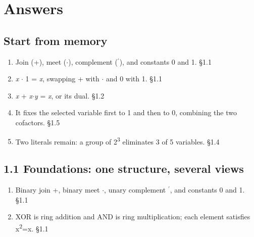 \documentclass[11pt]{article}
\begin{document}
\clearpage
\section{Answers}
\begin{keepsection}\subsection{Start from memory}

\begin{enumerate}
\item Join (+), meet (\ensuremath{\cdot}), complement (\ensuremath{{}^{\prime}}), and constants 0 and 1. \hfill{\small\color{FAUblue}§1.1}
\item \textit{x} \ensuremath{\cdot} 1 = \textit{x}, swapping + with \ensuremath{\cdot} and 0 with 1. \hfill{\small\color{FAUblue}§1.1}
\item \textit{x} + \textit{x}\ensuremath{\cdot}\textit{y} = \textit{x}, or its dual. \hfill{\small\color{FAUblue}§1.2}
\item It fixes the selected variable first to 1 and then to 0, combining the two cofactors. \hfill{\small\color{FAUblue}§1.5}
\item Two literals remain: a group of 2\textsuperscript{3} eliminates 3 of 5 variables. \hfill{\small\color{FAUblue}§1.4}
\end{enumerate}

\end{keepsection}
\begin{keepsection}\subsection{1.1 Foundations: one structure, several views}

\begin{enumerate}
\item Binary join +, binary meet \ensuremath{\cdot}, unary complement \ensuremath{{}^{\prime}}, and constants 0 and 1. \hfill{\small\color{FAUblue}§1.1}
\item XOR is ring addition and AND is ring multiplication; each element satisfies x\textsuperscript{2}=x. \hfill{\small\color{FAUblue}§1.1}
\end{enumerate}

\end{keepsection}
\end{document}
